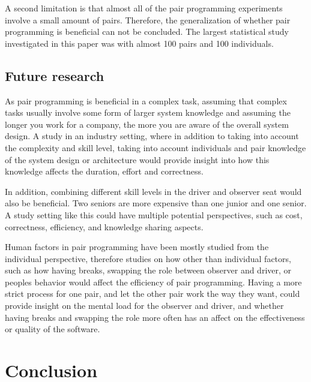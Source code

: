 \documentclass[conference]{IEEEtran}
\begin{document}
A second limitation is that almost all of the pair programming experiments involve a small amount of pairs. Therefore, the generalization of whether pair programming is beneficial can not be concluded. The largest statistical study investigated in this paper was \cite{Arisholm2007Evaluating} with almost 100 pairs and 100 individuals. 


\subsection{Future research}

As pair programming is beneficial in a complex task, assuming that complex tasks usually involve some form of larger system knowledge and assuming the longer you work for a company, the more you are aware of the overall system design. A study in an industry setting, where in addition to taking into account the complexity and skill level, taking into account individuals and pair knowledge of the system design or architecture would provide insight into how this knowledge affects the duration, effort and correctness.

In addition, combining different skill levels in the driver and observer seat would also be beneficial. Two seniors are more expensive than one junior and one senior. A study setting like this could have multiple potential perspectives, such as cost, correctness, efficiency, and knowledge sharing aspects.

Human factors in pair programming have been mostly studied from the individual perspective, therefore studies on how other than individual factors, such as how having breaks, swapping the role between observer and driver, or peoples behavior would affect the efficiency of pair programming. Having a more strict process for one pair, and let the other pair work the way they want, could provide insight on the mental load for the observer and driver, and whether having breaks and swapping the role more often has an affect on the effectiveness or quality of the software.

\section{Conclusion}
\end{document}
